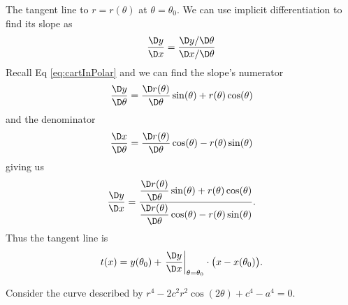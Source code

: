 \M
The tangent line to $r=r(\theta)$ at $\theta=\theta_{0}$. We can
use implicit differentiation to find its slope as
\begin{equation}
\frac{\D y}{\D x}=\frac{\D y/\D\theta}{\D x/\D\theta}
\end{equation}
Recall Eq \eqref{eq:cartInPolar} and we can find the slope's
numerator
\begin{equation}
\frac{\D y}{\D\theta}=\frac{\D r(\theta)}{\D\theta}\sin(\theta)+r(\theta)\cos(\theta)
\end{equation}
and the denominator
\begin{equation}
\frac{\D x}{\D\theta}=\frac{\D r(\theta)}{\D\theta}\cos(\theta)-r(\theta)\sin(\theta)
\end{equation}
giving us
\begin{equation}
\frac{\D y}{\D x}=\frac{\displaystyle\frac{\D r(\theta)}{\D\theta}\sin(\theta)+r(\theta)\cos(\theta)}{\displaystyle\frac{\D r(\theta)}{\D\theta}\cos(\theta)-r(\theta)\sin(\theta)}.
\end{equation}
Thus the tangent line is
\begin{equation}
t(x) = y(\theta_{0}) + \left.\frac{\D y}{\D x}\right|_{\theta=\theta_{0}}\cdot\bigl(x-x(\theta_{0})\bigr).
\end{equation}


\begin{exercise}
Consider the curve described by
$r^{4}-2c^{2}r^{2}\cos(2\theta)+c^{4}-a^{4}=0$. 
\end{exercise}
